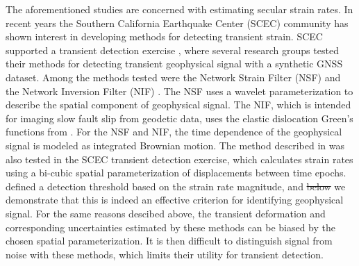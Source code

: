 \documentclass[extra,mreferee]{gji}
\providecommand{\DIFdel}[1]{{\protect\color{red}\sout{#1}}}                      %
\providecommand{\DIFaddbegin}{} %
\providecommand{\DIFaddend}{} %
\providecommand{\DIFdelbegin}{} %
\providecommand{\DIFdelend}{} %
\begin{document}
\DIFaddbegin 

\DIFaddend The aforementioned studies are concerned with estimating secular
strain rates. In recent years the Southern California Earthquake
Center (SCEC) community has shown interest in developing methods for
detecting transient strain. SCEC supported a transient detection
exercise \citep{Lohman2013}, where several research groups tested
their methods for detecting transient geophysical signal with a
synthetic GNSS dataset. Among the methods tested were the Network
Strain Filter (NSF) \citep{Ohtani2010} and the Network Inversion
Filter (NIF) \citep{Segall1997}. The NSF uses a wavelet
parameterization to describe the spatial component of geophysical
signal. The NIF, which is intended for imaging slow fault slip from
geodetic data, uses the elastic dislocation Green's functions from
\citet{Okada1992}. For the NSF and NIF, the time dependence of the
geophysical signal is modeled as integrated Brownian motion. The
method described in \citet{Holt2013} was also tested in the SCEC
transient detection exercise, which calculates strain rates using a
bi-cubic spatial parameterization of displacements between time
epochs. \citet{Holt2013} defined a detection threshold based on the
strain rate magnitude, and \DIFdelbegin \DIFdel{below }\DIFdelend we demonstrate that this is indeed an
effective criterion for identifying geophysical signal. For the same
reasons descibed above, the transient deformation and corresponding
uncertainties estimated by these methods can be biased by the chosen
spatial parameterization. It is then difficult to distinguish signal
from noise with these methods, which limits their utility for
transient detection.

\DIFaddbegin 
\end{document}
